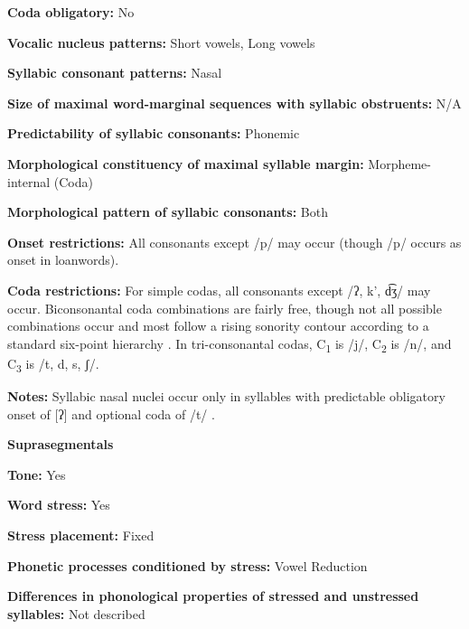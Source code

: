 \textbf{Coda obligatory:} No



\textbf{Vocalic nucleus patterns:} Short vowels, Long vowels



\textbf{Syllabic consonant patterns:} Nasal



\textbf{Size of maximal word{}-marginal sequences with syllabic obstruents:} N/A



\textbf{Predictability of syllabic consonants:} Phonemic



\textbf{Morphological constituency of maximal syllable margin:} Morpheme-internal (Coda)



\textbf{Morphological pattern of syllabic consonants:} Both



\textbf{Onset restrictions:} All consonants except /p/ may occur (though /p/ occurs as onset in loanwords).



\textbf{Coda restrictions:} For simple codas, all consonants except /ʔ, k’, d͡ʒ/ may occur. Biconsonantal coda combinations are fairly free, though not all possible combinations occur and most follow a rising sonority contour according to a standard six-point hierarchy . In tri-consonantal codas, C\textsubscript{1} is /j/, C\textsubscript{2} is /n/, and C\textsubscript{3} is /t, d, s, ʃ/.



\textbf{Notes:} Syllabic nasal nuclei occur only in syllables with predictable obligatory onset of [ʔ] and optional coda of /t/ \citep[41]{Beachy2005}.



\textbf{Suprasegmentals}



\textbf{Tone:} Yes



\textbf{Word stress:} Yes



\textbf{Stress placement:} Fixed



\textbf{Phonetic processes conditioned by stress:} Vowel Reduction



\textbf{Differences in phonological properties of stressed and unstressed syllables:} Not described



